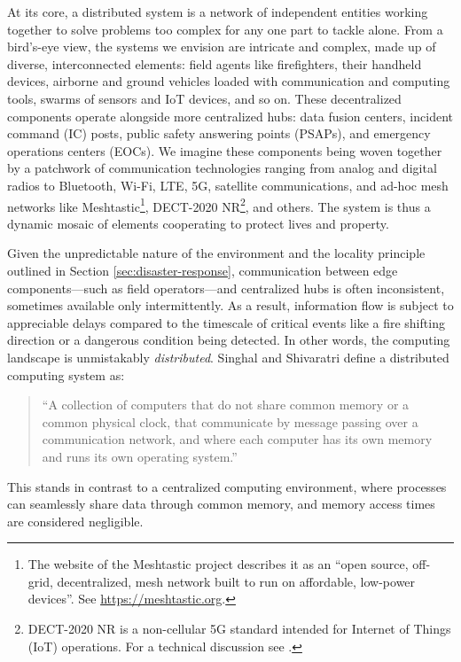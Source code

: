\documentclass[]             %
{NASA}                       %
\theoremstyle{definition}
\begin{document}
At its core, a distributed system is a network of independent entities
working together to solve problems too complex for any one part to
tackle alone. From a bird’s-eye view, the systems we envision are
intricate and complex, made up of diverse, interconnected elements:
field agents like firefighters, their handheld devices, airborne and
ground vehicles loaded with communication and computing tools, swarms
of sensors and IoT devices, and so on. These decentralized components
operate alongside more centralized hubs: data fusion centers, incident
command (IC) posts, public safety answering points (PSAPs), and
emergency operations centers (EOCs). We imagine these components being
woven together by a patchwork of communication technologies ranging
from analog and digital radios to Bluetooth, Wi-Fi, LTE, 5G, satellite
communications, and ad-hoc mesh networks like Meshtastic\footnote{The
  website of the Meshtastic project describes it as an ``open source,
  off-grid, decentralized, mesh network built to run on affordable,
  low-power devices''. See \url{https://meshtastic.org}.}, DECT-2020
NR\footnote{DECT-2020 NR is a non-cellular 5G
  standard intended for Internet of Things (IoT) operations. For a
  technical discussion see \cite{2022:dect-2020-nr}.}, and others. The
system is thus a dynamic mosaic of elements cooperating to protect
lives and property.

Given the unpredictable nature of the environment and the locality
principle outlined in Section \ref{sec:disaster-response},
communication between edge components---such as field operators---and
centralized hubs is often inconsistent, sometimes available only
intermittently. As a result, information flow is subject to
appreciable delays compared to the timescale of critical events like a
fire shifting direction or a dangerous condition being detected. In
other words, the computing landscape is unmistakably
\emph{distributed}. Singhal and Shivaratri \cite{10.5555/562065}
define a distributed computing system as:
\begin{quote}
  ``A collection of computers that do not share common
  memory or a common physical clock, that communicate by message
  passing over a communication network, and where each computer has
  its own memory and runs its own operating system.''
\end{quote}
This stands in contrast to a centralized computing environment, where
processes can seamlessly share data through common memory, and memory
access times are considered negligible.
\end{document}
